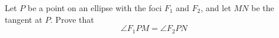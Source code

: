 \begin{problem}
    Let \( P \) be a point on an ellipse with the foci \( F_1 \) and \( F_2 \), and let \( MN \) be the tangent at \( P \). Prove that
    \[ \angle F_1PM=\angle F_2PN\]
\end{problem}
